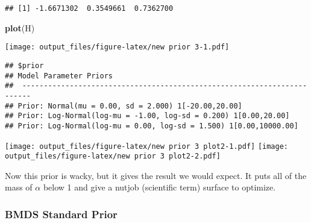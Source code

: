 \documentclass[]{article}
\newenvironment{Shaded}{\begin{snugshade}}{\end{snugshade}}
\newcommand{\DataTypeTok}[1]{\textcolor[rgb]{0.13,0.29,0.53}{#1}}
\newcommand{\DecValTok}[1]{\textcolor[rgb]{0.00,0.00,0.81}{#1}}
\newcommand{\FloatTok}[1]{\textcolor[rgb]{0.00,0.00,0.81}{#1}}
\newcommand{\KeywordTok}[1]{\textcolor[rgb]{0.13,0.29,0.53}{\textbf{#1}}}
\newcommand{\NormalTok}[1]{#1}
\newcommand{\OperatorTok}[1]{\textcolor[rgb]{0.81,0.36,0.00}{\textbf{#1}}}
\newcommand{\StringTok}[1]{\textcolor[rgb]{0.31,0.60,0.02}{#1}}
\begin{document}
\begin{verbatim}
## [1] -1.6671302  0.3549661  0.7362700
\end{verbatim}

\begin{Shaded}
\begin{Highlighting}[]
\KeywordTok{plot}\NormalTok{(H)}
\end{Highlighting}
\end{Shaded}

\texttt{[image: output\_files/figure-latex/new prior 3-1.pdf]}

\begin{Shaded}
\end{Shaded}

\begin{verbatim}
## $prior
## Model Parameter Priors
##  ------------------------------------------------------------------------
## Prior: Normal(mu = 0.00, sd = 2.000) 1[-20.00,20.00]
## Prior: Log-Normal(log-mu = -1.00, log-sd = 0.200) 1[0.00,20.00]
## Prior: Log-Normal(log-mu = 0.00, log-sd = 1.500) 1[0.00,10000.00]
\end{verbatim}

\texttt{[image: output\_files/figure-latex/new prior 3 plot2-1.pdf]}
\texttt{[image: output\_files/figure-latex/new prior 3 plot2-2.pdf]}

Now this prior is wacky, but it gives the result we would expect. It
puts all of the mass of \(\alpha\) below 1 and give a nutjob (scientific
term) surface to optimize.

\hypertarget{bmds-standard-prior}{%
\subsubsection{BMDS Standard Prior}\label{bmds-standard-prior}}

\begin{Shaded}
\end{Shaded}
\end{document}
